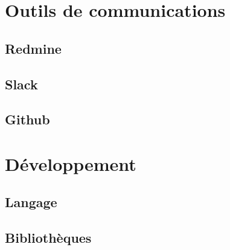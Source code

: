 \section{Outils de communications}

\subsection{Redmine}

\subsection{Slack}

\subsection{Github}

\section{Développement}

\subsection{Langage}

\subsection{Bibliothèques}